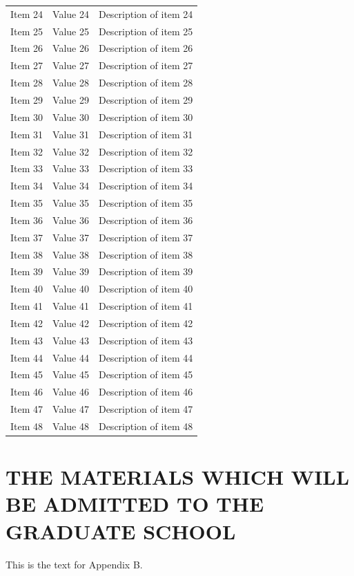 {\begin{longtable}{p{4.2cm}p{3.6cm}p{5.7cm}}
Item 24 & Value 24 & Description of item 24 \\
Item 25 & Value 25 & Description of item 25 \\
Item 26 & Value 26 & Description of item 26 \\
Item 27 & Value 27 & Description of item 27 \\
Item 28 & Value 28 & Description of item 28 \\
Item 29 & Value 29 & Description of item 29 \\
Item 30 & Value 30 & Description of item 30 \\
Item 31 & Value 31 & Description of item 31 \\
Item 32 & Value 32 & Description of item 32 \\
Item 33 & Value 33 & Description of item 33 \\
Item 34 & Value 34 & Description of item 34 \\
Item 35 & Value 35 & Description of item 35 \\
Item 36 & Value 36 & Description of item 36 \\
Item 37 & Value 37 & Description of item 37 \\
Item 38 & Value 38 & Description of item 38 \\
Item 39 & Value 39 & Description of item 39 \\
Item 40 & Value 40 & Description of item 40 \\
Item 41 & Value 41 & Description of item 41 \\
Item 42 & Value 42 & Description of item 42 \\
Item 43 & Value 43 & Description of item 43 \\
Item 44 & Value 44 & Description of item 44 \\
Item 45 & Value 45 & Description of item 45 \\
Item 46 & Value 46 & Description of item 46 \\
Item 47 & Value 47 & Description of item 47 \\
Item 48 & Value 48 & Description of item 48 \\
\end{longtable}}

\chapter{THE MATERIALS WHICH WILL BE ADMITTED TO THE GRADUATE SCHOOL}
\label{app:materials}

This is the text for Appendix B.
